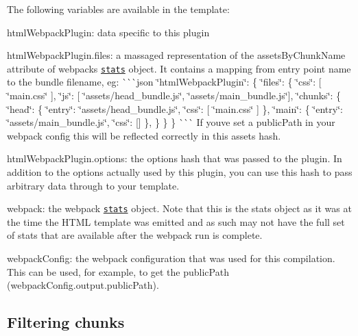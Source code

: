 The following variables are available in the template\+:
\begin{DoxyItemize}
\item {\ttfamily html\+Webpack\+Plugin}\+: data specific to this plugin
\begin{DoxyItemize}
\item {\ttfamily html\+Webpack\+Plugin.\+files}\+: a massaged representation of the {\ttfamily assets\+By\+Chunk\+Name} attribute of webpack\textquotesingle{}s \href{https://github.com/webpack/docs/wiki/node.js-api#stats}{\tt stats} object. It contains a mapping from entry point name to the bundle filename, eg\+: \`{}\`{}\`{}json \char`\"{}html\+Webpack\+Plugin\char`\"{}\+: \{ \char`\"{}files\char`\"{}\+: \{ \char`\"{}css\char`\"{}\+: \mbox{[} \char`\"{}main.\+css\char`\"{} \mbox{]}, \char`\"{}js\char`\"{}\+: \mbox{[} \char`\"{}assets/head\+\_\+bundle.\+js\char`\"{}, \char`\"{}assets/main\+\_\+bundle.\+js\char`\"{}\mbox{]}, \char`\"{}chunks\char`\"{}\+: \{ \char`\"{}head\char`\"{}\+: \{ \char`\"{}entry\char`\"{}\+: \char`\"{}assets/head\+\_\+bundle.\+js\char`\"{}, \char`\"{}css\char`\"{}\+: \mbox{[} \char`\"{}main.\+css\char`\"{} \mbox{]} \}, \char`\"{}main\char`\"{}\+: \{ \char`\"{}entry\char`\"{}\+: \char`\"{}assets/main\+\_\+bundle.\+js\char`\"{}, \char`\"{}css\char`\"{}\+: \mbox{[}\mbox{]} \}, \} \} \} \`{}\`{}\`{} If you\textquotesingle{}ve set a public\+Path in your webpack config this will be reflected correctly in this assets hash.
\item {\ttfamily html\+Webpack\+Plugin.\+options}\+: the options hash that was passed to the plugin. In addition to the options actually used by this plugin, you can use this hash to pass arbitrary data through to your template.
\end{DoxyItemize}
\item {\ttfamily webpack}\+: the webpack \href{https://github.com/webpack/docs/wiki/node.js-api#stats}{\tt stats} object. Note that this is the stats object as it was at the time the H\+T\+ML template was emitted and as such may not have the full set of stats that are available after the webpack run is complete.
\item {\ttfamily webpack\+Config}\+: the webpack configuration that was used for this compilation. This can be used, for example, to get the {\ttfamily public\+Path} ({\ttfamily webpack\+Config.\+output.\+public\+Path}).
\end{DoxyItemize}

\subsection*{Filtering chunks }

